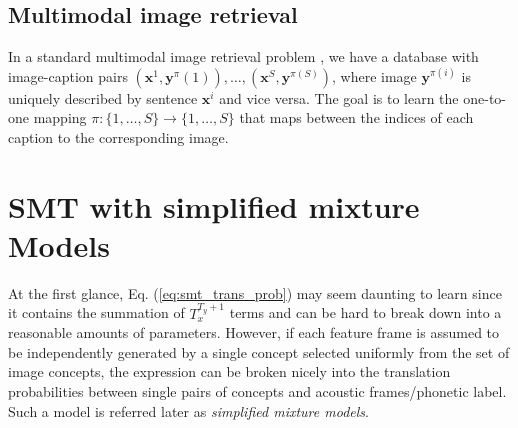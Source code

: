 \documentclass[journal]{IEEEtran}
\begin{document}
\subsection{Multimodal image retrieval}
In a standard multimodal image retrieval problem \cite{Karpathy14}, we have a database with image-caption pairs $(\mathbf x^1, \mathbf y^\pi(1)), \ldots, (\mathbf x^S, \mathbf y^{\pi(S)})$, where image $\mathbf y^{\pi(i)}$ is uniquely described by sentence $\mathbf x^i$ and vice versa. The goal is to learn the one-to-one mapping $\pi: \{1, \ldots, S\} \rightarrow \{1, \ldots, S\}$ that maps between the indices of each caption to the corresponding image.

\section{SMT with simplified mixture Models}
At the first glance, Eq. (\ref{eq:smt_trans_prob}) may seem daunting to learn since it contains the summation of $T_x^{T_y+1}$ terms and can be hard to break down into a reasonable amounts of parameters. However, if each feature frame is assumed to be independently generated by a single concept selected uniformly from the set of image concepts, the expression can be broken nicely into the translation probabilities between single pairs of concepts and acoustic frames/phonetic label. Such a model is referred later as \textit{simplified mixture models}.
\end{document}
